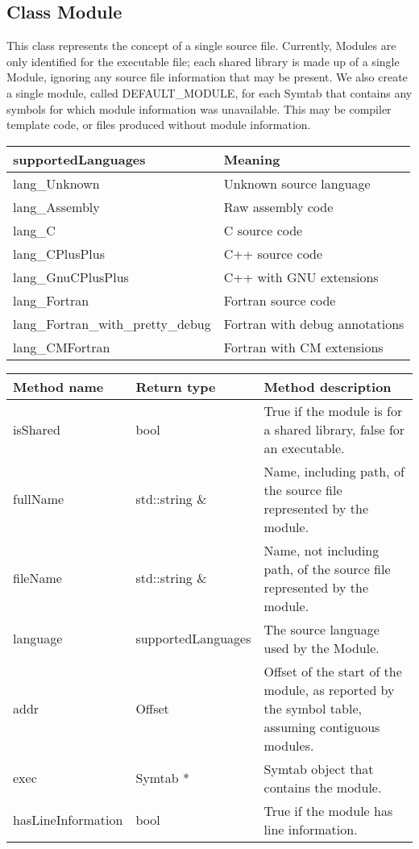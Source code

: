 \subsection{Class Module}\label{Module}
This class represents the concept of a single source file. Currently, Modules are only identified for the executable file; each shared library is made up of a single Module, ignoring any source file information that may be present. We also create a single module, called DEFAULT\_MODULE, for each Symtab that contains any symbols for which module information was unavailable. This may be compiler template code, or files produced without module information. 

\begin{center}
\begin{tabular}{ll}
\toprule
supportedLanguages & Meaning \\
\midrule
lang\_Unknown & Unknown source language \\
lang\_Assembly & Raw assembly code \\
lang\_C & C source code \\
lang\_CPlusPlus & C++ source code \\
lang\_GnuCPlusPlus & C++ with GNU extensions \\
lang\_Fortran & Fortran source code \\
lang\_Fortran\_with\_pretty\_debug & Fortran with debug annotations \\
lang\_CMFortran & Fortran with CM extensions \\
\bottomrule
\end{tabular}
\end{center}

\begin{tabular}{p{1.25in}p{1.25in}p{3in}}
	Method name & Return type & Method description \\
	\hline
	isShared & bool & True if the module is for a shared library, false for an executable. \\
	fullName & std::string \& & Name, including path, of the source file represented by the module. \\
	fileName & std::string \& & Name, not including path, of the source file represented by the module. \\
	language & supportedLanguages & The source language used by the Module. \\
	addr & Offset & Offset of the start of the module, as reported by the symbol table, assuming contiguous modules. \\
	exec & Symtab * & Symtab object that contains the module. \\
	hasLineInformation & bool & True if the module has line information. \\
\end{tabular}



